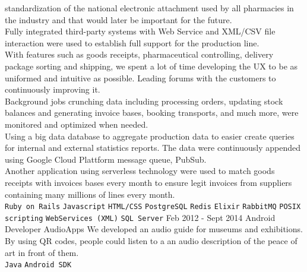 \documentclass[9pt]{template} %
\begin{document}
\begin{entrylist}
{      standardization of the national electronic attachment used by all
      pharmacies in the industry and that would later be important for the
      future.\\
      Fully integrated third-party systems with Web Service and XML/CSV file
      interaction were used to establish full support for the
      production line.\\
      With features such as goods receipts, pharmaceutical controlling, delivery
      package sorting and shipping, we spent a lot of time developing the UX to
      be as uniformed and intuitive as possible. Leading forums with the
      customers to continuously improving it.\\
      Background jobs crunching data including processing orders, updating stock
      balances and generating invoice bases, booking transports, and much more,
      were monitored and optimized when needed.\\
      Using a big data database to aggregate production data to easier create
      queries for internal and external statistics reports. The data were
      continuously appended using Google Cloud Plattform message queue, PubSub.\\
      Another application using serverless technology were used to match goods
      receipts with invoices bases every month to ensure legit invoices from
      suppliers containing many millions of lines every month.\\
      \texttt{Ruby on Rails}\slashsep
      \texttt{Javascript}\slashsep
      \texttt{HTML/CSS}\slashsep
      \texttt{PostgreSQL}\slashsep
      \texttt{Redis}\slashsep
      \texttt{Elixir}\slashsep
      \texttt{RabbitMQ}\slashsep
      \texttt{POSIX scripting}\slashsep
      \texttt{WebServices (XML)}\slashsep
      \texttt{SQL Server}
    }
  \entry
    {Feb 2012 - Sept 2014}
    {Android Developer}
    {AudioApps}
    {We developed an audio guide for museums and exhibitions. By using QR codes,
      people could listen to a an audio description of the peace of art in front
      of them.\\
      \texttt{Java}\slashsep
      \texttt{Android SDK}
    }
\end{entrylist}

\pagebreak

\end{document}
